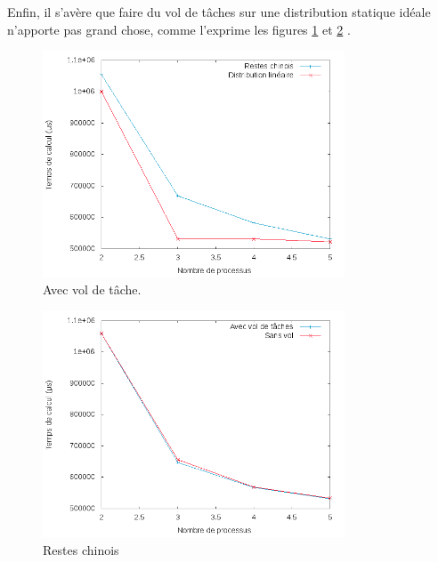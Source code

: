 Enfin, il s'avère que faire du vol de tâches sur une distribution statique idéale n'apporte pas grand chose, comme l'exprime les figures \ref{vol_chinois_lin} et \ref{vol_chinois_chinois} .
\begin{figure}[H]
\centering
\includegraphics[width=0.8\textwidth]{vol_chinois_lin.png}
\caption{Avec vol de tâche.}
\label{vol_chinois_lin}
\end{figure}

\begin{figure}[H]
\centering
\includegraphics[width=0.8\textwidth]{vol_chinois_chinois}
\caption{Restes chinois}
\label{vol_chinois_chinois}
\end{figure}


